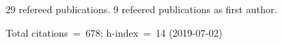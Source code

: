 29 refereed publications. 9 refeered publications as first author.

Total citations~=~678; h-index~=~14 (2019-07-02)